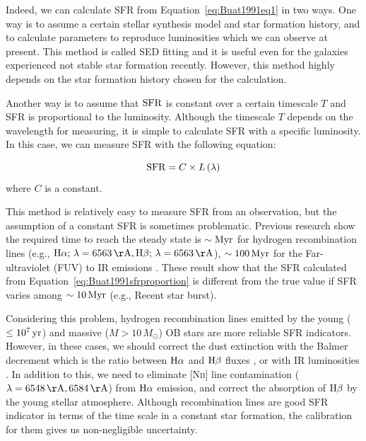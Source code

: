 Indeed, we can calculate SFR from Equation~\ref{eq:Buat1991eq1} in two ways.
One way is to assume a certain stellar synthesis model and star formation history, and to calculate parameters to reproduce luminosities which we can observe at present.
This method is called SED fitting and it is useful even for the galaxies experienced not stable star formation recently.
However, this method highly depends on the star formation history chosen for the calculation.

Another way is to assume that $\mathrm{SFR}$ is constant over a certain timescale $T$ and SFR is proportional to the luminosity.
Although the timescale $T$ depends on the wavelength for measuring, it is simple to calculate SFR with a specific luminosity.
In this case, we can measure SFR with the following equation:

\begin{equation}\label{eq:Buat1991sfrproportion}
    \mathrm{SFR} = C \times L\left(\lambda\right)
\end{equation}
where $C$ is a constant.

This method is relatively easy to measure SFR from an observation, but the assumption of a constant SFR is sometimes problematic.
Previous research show the required time to reach the steady state is $\sim\mathrm{Myr}$ for hydrogen recombination lines (e.g., $\mr{H\alpha};\,\lambda = 6563\,\mr{\AA}, \mr{H\beta};\,\lambda = 6563\,\mr{\AA}$), $\sim 100\,\mathrm{Myr}$ for the Far-ultraviolet (FUV) to IR emissions \citep{Hao2011, Murphy2011, Kennicutt2012}.
These result show that the SFR calculated from Equation~\ref{eq:Buat1991sfrproportion} is different from the true value if SFR varies among $\sim 10\,\mathrm{Myr}$ (e.g., Recent star burst).

Considering this problem, hydrogen recombination lines emitted by the young ($\leq 10^7\,\mathrm{yr}$) and massive ($M > 10\,M_{\odot}$) OB stars are more reliable SFR indicators.
However, in these cases, we should correct the dust extinction with the Balmer decrement which is the ratio between $\mathrm{H\alpha}$ and $\mathrm{H\beta}$ fluxes \citep{Lequeux1981}, or with IR luminosities \citep{Kennicutt2009}.
In addition to this, we need to eliminate [N\textsc{ii}] line contamination ($\lambda = 6548\,\mr{\AA}, 6584\,\mr{\AA}$) from $\mathrm{H}\alpha$ emission, and correct the absorption of $\mathrm{H\beta}$ by the young stellar atmosphere.
Although recombination lines are good SFR indicator in terms of the time scale in a constant star formation, the calibration for them gives us non-negligible uncertainty.

